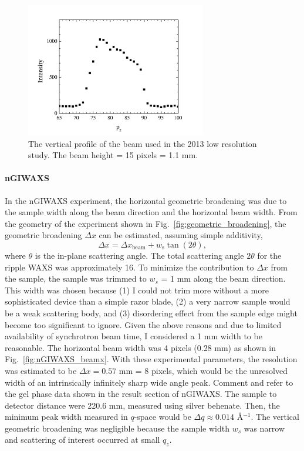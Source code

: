 \begin{figure}[p]
  \centering
  \includegraphics[width=0.7\textwidth]{figures/ripple/MMs/laxs/beamz_lr}
  \caption{The vertical profile of the beam used in the 2013 low resolution study.
  The beam height = 15 pixels = 1.1 mm.}
  \label{fig:ripple_lr_beamz}
\end{figure}

\paragraph{nGIWAXS}
In the nGIWAXS experiment, 
the horizontal geometric broadening was due to the
sample width along the beam direction and the horizontal beam width.
From the geometry of the experiment shown in Fig.~\ref{fig:geometric_broadening}, 
the geometric broadening $\Delta x$ can be estimated,
assuming simple additivity,
\[
\Delta x = \Delta x_\textrm{beam} + w_\textrm{s}\tan(2\theta),
\] 
where $\theta$ is the in-plane scattering angle.
The total scattering angle $2\theta$ for the ripple WAXS was approximately 
16\textdegree. 
To minimize the contribution to $\Delta x$ from the sample, 
the sample was trimmed to $w_s$ = 1 mm along the beam direction. 
This width was chosen because (1) I could not trim more
without a more sophisticated device than a simple razor blade, (2) a very
narrow sample would be a weak scattering body, and (3) disordering effect from 
the sample edge might become too significant to ignore. 
Given the above reasons and due to limited availability
of synchrotron beam time, I considered a 1 mm width to be reasonable.
The horizontal beam width was 4 pixels (0.28 mm) as shown in
Fig.~\ref{fig:nGIWAXS_beamx}.
With these experimental parameters, 
the resolution was estimated to be $\Delta x = 0.57$ mm = 8 pixels, 
which would be the unresolved width of an intrinsically infinitely sharp 
wide angle peak.
{\color{red} Comment and refer to the gel phase data shown in the 
result section of nGIWAXS.}
The sample to detector distance were 220.6 mm, measured using silver behenate.
Then, the minimum peak width measured in $q$-space would be
$\Delta q \approx 0.014$ \AA$^{-1}$. The vertical geometric broadening 
was negligible because the sample width $w_s$ was narrow and scattering
of interest occurred at small $q_z$.

